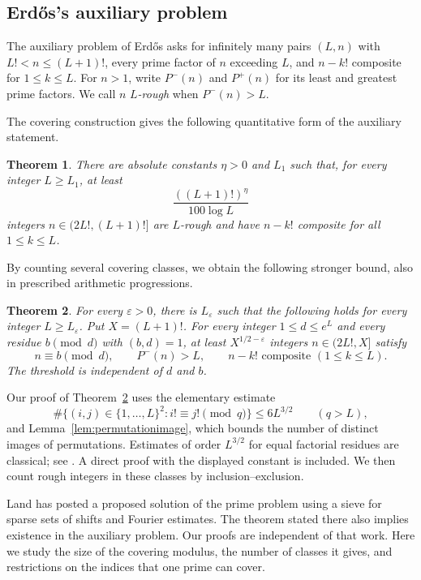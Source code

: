 \documentclass[11pt]{amsart}
\newtheorem{theorem}{Theorem}[section]
\theoremstyle{definition}
\theoremstyle{remark}
\begin{document}
\subsection*{Erd\H{o}s's auxiliary problem}
The auxiliary problem of Erd\H{o}s asks for infinitely many pairs $(L,n)$
with $L!<n\leq(L+1)!$, every prime factor of $n$ exceeding $L$, and
$n-k!$ composite for $1\leq k\leq L$.
For $n>1$, write $P^-(n)$ and $P^+(n)$ for its least and greatest prime
factors. We call $n$ \emph{$L$-rough} when $P^-(n)>L$.

The covering construction gives the following quantitative form of the
auxiliary statement.
\begin{theorem}\label{thm:main}
There are absolute constants $\eta>0$ and $L_1$ such that, for every
integer $L\geq L_1$, at least
\[
\frac{((L+1)!)^\eta}{100\log L}
\]
integers $n\in(2L!,(L+1)!]$ are $L$-rough and have $n-k!$ composite for
all $1\leq k\leq L$.
\end{theorem}

By counting several covering classes, we obtain the following stronger
bound, also in prescribed arithmetic progressions.
\begin{theorem}\label{thm:abundance}
For every $\varepsilon>0$, there is $L_\varepsilon$ such that the following
holds for every integer $L\geq L_\varepsilon$. Put $X=(L+1)!$.
For every integer $1\leq d\leq e^L$ and every residue $b\pmod d$ with
$(b,d)=1$, at least $X^{1/2-\varepsilon}$ integers
$n\in(2L!,X]$ satisfy
\[
n\equiv b\pmod d,\qquad P^-(n)>L,
\qquad n-k!\text{ composite }(1\leq k\leq L).
\]
The threshold is independent of $d$ and $b$.
\end{theorem}

Our proof of Theorem~\ref{thm:abundance} uses the elementary estimate
\[
\#\{(i,j)\in\{1,\ldots,L\}^2:i!\equiv j!\pmod q\}
\leq6L^{3/2}\qquad(q>L),
\]
and Lemma~\ref{lem:permutationimage}, which bounds the number of
distinct images of permutations. Estimates of order $L^{3/2}$ for
equal factorial residues are classical; see
\cite[Theorem~1, with $\ell=1$]{GaraevLucaShparlinski}. A direct proof
with the displayed constant is included. We then count rough integers
in these classes by inclusion--exclusion.

Land \cite{Land} has posted a proposed solution of the prime problem
using a sieve for sparse sets of shifts and Fourier estimates. The
theorem stated there also implies existence in the auxiliary problem.
Our proofs are independent of that work. Here we study the size of the
covering modulus, the number of classes it gives, and restrictions on
the indices that one prime can cover.
\end{document}
